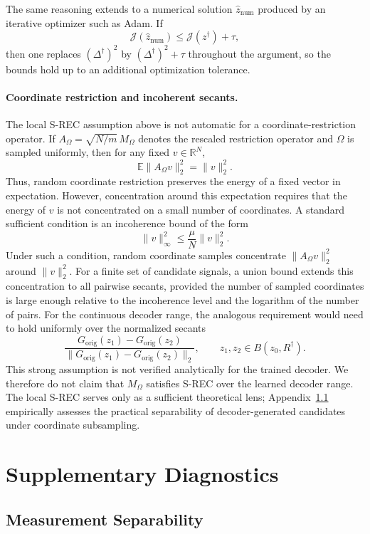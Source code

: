 The same reasoning extends to a numerical solution \(\hat z_{\mathrm{num}}\)
produced by an iterative optimizer such as Adam. If
\[
  \mathcal{J}(\hat z_{\mathrm{num}})\le \mathcal{J}(z^\dagger)+\tau,
\]
then one replaces \((\Delta^\dagger)^2\) by \((\Delta^\dagger)^2+\tau\)
throughout the argument, so the bounds hold up to an additional optimization
tolerance.

\paragraph{Coordinate restriction and incoherent secants.}
The local S-REC assumption above is not automatic for a coordinate-restriction
operator. If \(A_\Omega=\sqrt{N/m}\,M_\Omega\) denotes the rescaled restriction
operator and \(\Omega\) is sampled uniformly, then for any fixed
\(v\in\mathbb{R}^N\),
\[
  \mathbb{E}\|A_\Omega v\|_2^2=\|v\|_2^2.
\]
Thus, random coordinate restriction preserves the energy of a fixed vector in
expectation. However, concentration around this expectation requires that the
energy of \(v\) is not concentrated on a small number of coordinates. A
standard sufficient condition is an incoherence bound of the form
\[
  \|v\|_\infty^2
  \le
  \frac{\mu}{N}\|v\|_2^2.
\]
Under such a condition, random coordinate samples concentrate
\(\|A_\Omega v\|_2^2\) around \(\|v\|_2^2\). For a finite set of candidate
signals, a union bound extends this concentration to all pairwise secants,
provided the number of sampled coordinates is large enough relative to the
incoherence level and the logarithm of the number of pairs. For the continuous
decoder range, the analogous requirement would need to hold uniformly over the
normalized secants
\[
  \frac{G_{\mathrm{orig}}(z_1)-G_{\mathrm{orig}}(z_2)}{\|G_{\mathrm{orig}}(z_1)-G_{\mathrm{orig}}(z_2)\|_2},
  \qquad
  z_1,z_2\in B(z_0,R^\dagger).
\]
This strong assumption is not verified analytically for the trained decoder.
We therefore do not claim that \(M_\Omega\) satisfies S-REC over the learned
decoder range. The local S-REC serves only as a sufficient theoretical lens;
Appendix~\ref{app:separability} empirically assesses the practical separability
of decoder-generated candidates under coordinate subsampling.

\section{Supplementary Diagnostics}
\label{app:diagnostics}

\subsection{Measurement Separability}
\label{app:separability}

